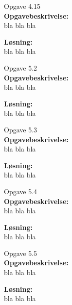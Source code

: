 \documentclass{article}
\begin{document}
{\LARGE Opgave 4.15}\\
\textbf{Opgavebeskrivelse:}\\
bla bla bla

\vspace{15px}
\textbf{Løsning:}\\
bla bla bla

\vspace{35px}


{\LARGE Opgave 5.2}\\
\textbf{Opgavebeskrivelse:}\\
bla bla bla

\vspace{15px}
\textbf{Løsning:}\\
bla bla bla

\vspace{35px}


{\LARGE Opgave 5.3}\\
\textbf{Opgavebeskrivelse:}\\
bla bla bla

\vspace{15px}
\textbf{Løsning:}\\
bla bla bla

\vspace{35px}


{\LARGE Opgave 5.4}\\
\textbf{Opgavebeskrivelse:}\\
bla bla bla

\vspace{15px}
\textbf{Løsning:}\\
bla bla bla

\vspace{35px}

{\LARGE Opgave 5.5}\\
\textbf{Opgavebeskrivelse:}\\
bla bla bla

\vspace{15px}
\textbf{Løsning:}\\
bla bla bla
\end{document}
